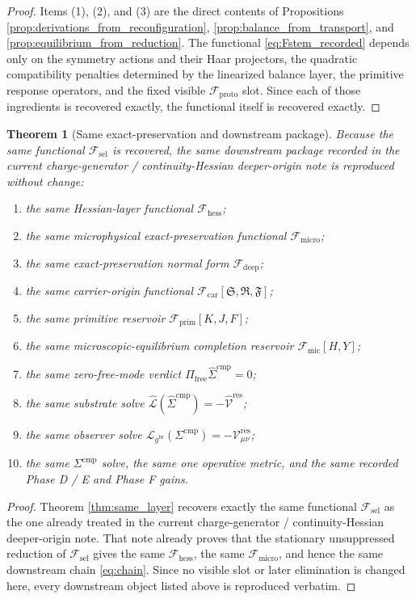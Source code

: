 \documentclass[11pt]{article}
\newcommand{\ObserverMetric}{g^{\mathrm{br}}}
\newcommand{\CompShift}{\Sigma^{\mathrm{cmp}}}
\newcommand{\CompLift}{\widehat\Sigma^{\mathrm{cmp}}}
\newcommand{\ResidualCore}{\mathcal V_{\mu\nu}^{\mathrm{res}}}
\newcommand{\ResidualLift}{\widehat{\mathcal V}^{\mathrm{res}}}
\newcommand{\SubReducedEin}{\widehat{\mathcal L}}
\newcommand{\FreeProj}{\Pi_{\mathrm{free}}}
\newcommand{\GaugeAux}{Y}
\newcommand{\ReducedEin}{\mathcal L_{\ObserverMetric}}
\newcommand{\MicFunctional}{\mathscr F_{\mathrm{mic}}}
\newcommand{\PrimFunctional}{\mathscr F_{\mathrm{prim}}}
\newcommand{\CarrierFunctional}{\mathscr F_{\mathrm{car}}}
\newcommand{\DeepFunctional}{\mathscr F_{\mathrm{deep}}}
\newcommand{\ProtoFunctional}{\mathscr F_{\mathrm{proto}}}
\newcommand{\UltraFunctional}{\mathscr F_{\mathrm{micro}}}
\newcommand{\RootFunctional}{\mathscr F_{\mathrm{hess}}}
\newcommand{\StemFunctional}{\mathscr F_{\mathrm{sel}}}
\newcommand{\PrimStrain}{K}
\newcommand{\PrimNeutral}{J}
\newcommand{\PrimFree}{F}
\newcommand{\CarrierSeed}{\mathfrak S}
\newcommand{\RelabelSeed}{\mathfrak R}
\newcommand{\FreeSeed}{\mathfrak F}
\newtheorem{theorem}{Theorem}
\begin{document}
\begin{proof}
Items (1), (2), and (3) are the direct contents of Propositions \ref{prop:derivations_from_reconfiguration}, \ref{prop:balance_from_transport}, and \ref{prop:equilibrium_from_reduction}. The functional \eqref{eq:Fstem_recorded} depends only on the symmetry actions and their Haar projectors, the quadratic compatibility penalties determined by the linearized balance layer, the primitive response operators, and the fixed visible \(\ProtoFunctional\) slot. Since each of those ingredients is recovered exactly, the functional itself is recovered exactly.
\end{proof}

\begin{theorem}[Same exact-preservation and downstream package]
\label{thm:same_package}
Because the same functional \(\StemFunctional\) is recovered, the same downstream package recorded in the current charge-generator / continuity-Hessian deeper-origin note is reproduced without change:
\begin{enumerate}
    \item the same Hessian-layer functional \(\RootFunctional\);
    \item the same microphysical exact-preservation functional \(\UltraFunctional\);
    \item the same exact-preservation normal form \(\DeepFunctional\);
    \item the same carrier-origin functional \(\CarrierFunctional[\CarrierSeed,\RelabelSeed,\FreeSeed]\);
    \item the same primitive reservoir \(\PrimFunctional[\PrimStrain,\PrimNeutral,\PrimFree]\);
    \item the same microscopic-equilibrium completion reservoir \(\MicFunctional[H,\GaugeAux]\);
    \item the same zero-free-mode verdict \(\FreeProj\CompLift=0\);
    \item the same substrate solve \(\SubReducedEin(\CompLift)=-\ResidualLift\);
    \item the same observer solve \(\ReducedEin(\CompShift)=-\ResidualCore\);
    \item the same \(\Sigma^{\mathrm{cmp}}\) solve, the same one operative metric, and the same recorded Phase D / E and Phase F gains.
\end{enumerate}
\end{theorem}

\begin{proof}
Theorem \ref{thm:same_layer} recovers exactly the same functional \(\StemFunctional\) as the one already treated in the current charge-generator / continuity-Hessian deeper-origin note. That note already proves that the stationary unsuppressed reduction of \(\StemFunctional\) gives the same \(\RootFunctional\), the same \(\UltraFunctional\), and hence the same downstream chain \eqref{eq:chain}. Since no visible slot or later elimination is changed here, every downstream object listed above is reproduced verbatim.
\end{proof}
\end{document}
